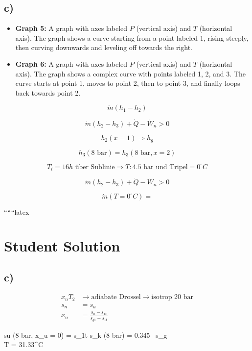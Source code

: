 

\subsection*{c)}

\begin{itemize}
    \item \textbf{Graph 5:} A graph with axes labeled $P$ (vertical axis) and $T$ (horizontal axis). The graph shows a curve starting from a point labeled 1, rising steeply, then curving downwards and leveling off towards the right.
    \item \textbf{Graph 6:} A graph with axes labeled $P$ (vertical axis) and $T$ (horizontal axis). The graph shows a complex curve with points labeled 1, 2, and 3. The curve starts at point 1, moves to point 2, then to point 3, and finally loops back towards point 2.
\end{itemize}

\[
\dot{m} (h_1 - h_2)
\]

\[
\dot{m} (h_2 - h_3) + \dot{Q} - \dot{W}_n > 0
\]

\[
h_2 (x = 1) \Rightarrow h_g
\]

\[
h_3 (8 \text{ bar}) = h_3 (8 \text{ bar}, x = 2)
\]

\[
T_i = 16 h \text{ über Sublinie} \Rightarrow T: 4.5 \text{ bar und Tripel} = 0^\circ C
\]

\[
\dot{m} (h_2 - h_3) + \dot{Q} - \dot{W}_n > 0
\]

\[
\dot{m} (T = 0^\circ C) =
\]

``````latex


\section*{Student Solution}



\subsection*{c)}

\begin{align*}
x_n T_2 &\rightarrow \text{adiabate Drossel} \rightarrow \text{isotrop 20 bar} \\
s_n &= s_u \\
x_n &= \frac{s_u - s_{1t}}{s_{g1} - s_{1t}}
\end{align*}

\noindent
su (8 bar, x_u = 0) = s_{1t} \quad s_{k} (8 bar) = 0.345 \, s_g \\
\Delta T = 31.33^\circ C